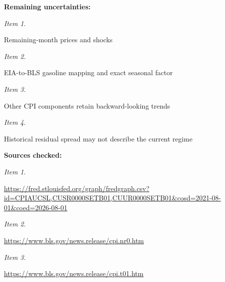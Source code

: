 \documentclass[11pt]{article}
\begin{document}
\par\noindent\textbf{Remaining uncertainties:} \par \par\noindent\textit{Item 1.}\par Remaining-month prices and shocks

\par\noindent\textit{Item 2.}\par EIA-to-BLS gasoline mapping and exact seasonal factor

\par\noindent\textit{Item 3.}\par Other CPI components retain backward-looking trends

\par\noindent\textit{Item 4.}\par Historical residual spread may not describe the current regime

\par\noindent\textbf{Sources checked:} \par \par\noindent\textit{Item 1.}\par \href{https://fred.stlouisfed.org/graph/fredgraph.csv?id=CPIAUCSL,CUSR0000SETB01,CUUR0000SETB01\&cosd=2021-08-01\&coed=2026-08-01}{https://fred\hspace{0pt}.stlouisfed.\hspace{0pt}org/graph/fr\hspace{0pt}edgraph.csv?\hspace{0pt}id=CPIAUCSL,\hspace{0pt}CUSR0000SETB\hspace{0pt}01,CUUR0000S\hspace{0pt}ETB01\&cosd=2\hspace{0pt}021-08-01\&co\hspace{0pt}ed=2026-08-0\hspace{0pt}1}

\par\noindent\textit{Item 2.}\par \href{https://www.bls.gov/news.release/cpi.nr0.htm}{https://www.\hspace{0pt}bls.gov/news\hspace{0pt}.release/cpi\hspace{0pt}.nr0.htm}

\par\noindent\textit{Item 3.}\par \href{https://www.bls.gov/news.release/cpi.t01.htm}{https://www.\hspace{0pt}bls.gov/news\hspace{0pt}.release/cpi\hspace{0pt}.t01.htm}
\end{document}

